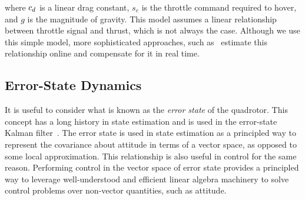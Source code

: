 \normalsize
where $c_d$ is a linear drag constant, $s_e$ is the throttle command required to hover, and $g$ is the magnitude of gravity.  This model assumes a linear relationship between throttle signal and thrust, which is not always the case.  Although we use this simple model, more sophisticated approaches, such as~\cite{small2018mpc} estimate this relationship online and compensate for it in real time.


\subsection{Error-State Dynamics} \label{subsec:error_state_dyn}

It is useful to consider what is known as the \emph{error state} of the
quadrotor.  This concept has a long history in state estimation and is used in
the error-state Kalman
filter~\cite{sola2017quaternion,Markley2004MultiplicativeVA}.  The error state
is used in state estimation as a principled way to represent the covariance
about attitude in terms of a vector space, as opposed to some local
approximation.  This relationship is also useful in control for the same reason.
Performing control in the vector space of error state provides a principled way
to leverage well-understood and efficient linear algebra machinery to solve
control problems over non-vector quantities, such as attitude.  

